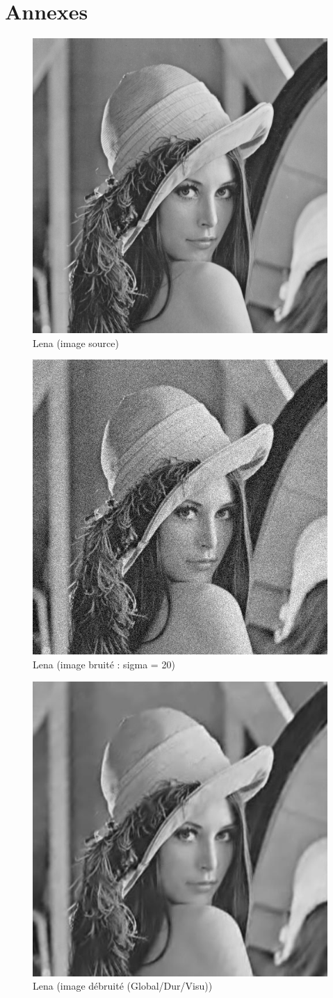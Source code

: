 \section{Annexes}

\begin{figure}[hbt!]
    \centering
    \includegraphics[width=0.35\linewidth]{reference/picture/lenaSource.png}
    \caption{Lena (image source)}
    \label{fig:lenaSource}
\end{figure}

\begin{figure}[hbt!]
    \centering
    \includegraphics[width=0.35\linewidth]{reference/picture/lenaNoised.png}
    \caption{Lena (image bruité : sigma = 20)}
\end{figure}
\begin{figure}[hbt!]
    \centering
    \includegraphics[width=0.35\linewidth]{reference/picture/lenaDenoised.png}
    \caption{Lena (image débruité (Global/Dur/Visu))}
\end{figure}

